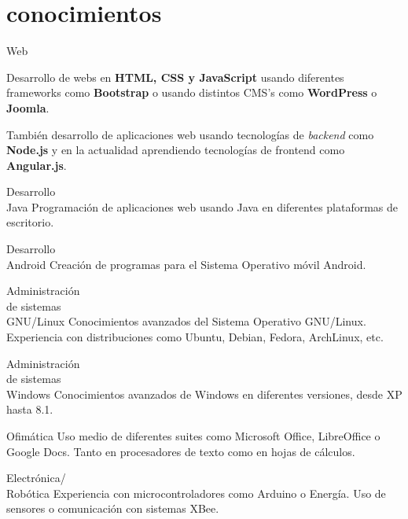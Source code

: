 \documentclass[hidelinks]{friggeri-cv} %
\begin{document}
\section{conocimientos}

\begin{entrylist}
\entry
{Web}
{}
{}
{Desarrollo de webs en \textbf{HTML, CSS y JavaScript} usando diferentes frameworks como
\textbf{Bootstrap} o usando distintos CMS's como \textbf{WordPress} o \textbf{Joomla}.

También desarrollo de aplicaciones web usando tecnologías de \emph{backend} como
\textbf{Node.js} y en la actualidad aprendiendo tecnologías de frontend como
\textbf{Angular.js}.
}

\entry
{Desarrollo \\ Java}
{}
{}
{Programación de aplicaciones web usando Java en diferentes plataformas de escritorio.}

\entry
{Desarrollo \\ Android}
{}
{}
{Creación de programas para el Sistema Operativo móvil Android.}

\entry
{Administración \\ de sistemas \\ GNU/Linux}
{}
{}
{Conocimientos avanzados del Sistema Operativo GNU/Linux. Experiencia con 
distribuciones como Ubuntu, Debian, Fedora, ArchLinux, etc.}

\entry
{Administración \\ de sistemas \\ Windows}
{}
{}
{Conocimientos avanzados de Windows en diferentes versiones, desde XP hasta 8.1.}
\end{entrylist}

\begin{entrylist}
\entry
{Ofimática}
{}
{}
{Uso medio de diferentes suites como Microsoft Office, LibreOffice o Google Docs.
Tanto en procesadores de texto como en hojas de cálculos.}

\entry
{Electrónica/ \\ Robótica}
{}
{}
{Experiencia con microcontroladores como Arduino o Energía. Uso de sensores o comunicación
con sistemas XBee.}
\end{entrylist}


\end{document}

